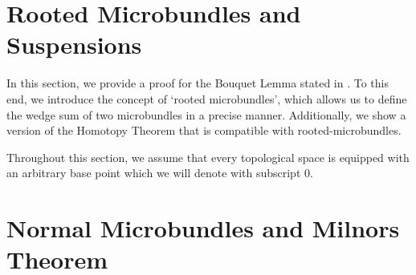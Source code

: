 \documentclass{article}
\begin{document}
\section{Rooted Microbundles and Suspensions}\label{chapter::suspension}
\begin{myparagraph}
    In this section,
    we provide a proof for the Bouquet Lemma stated in .
    To this end, we introduce the concept of `rooted microbundles',
    which allows us to define the wedge sum of two microbundles in a precise manner.
    Additionally, we show a version of the Homotopy Theorem
    that is compatible with rooted-microbundles.

    Throughout this section,
    we assume that every topological space is equipped with an arbitrary base point
    which we will denote with subscript $0$.
\end{myparagraph}


\section{Normal Microbundles and Milnors Theorem}\label{chapter::normal}


\end{document}
